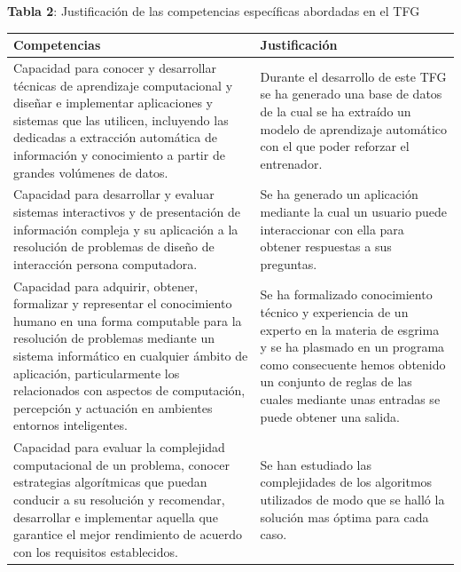 \documentclass[11pt,a4paper,twoside,final]{article}
\begin{document}
\begin{center}
   \textbf{Tabla 2}: Justificación de las competencias específicas abordadas en el TFG\\[1em]
   \begin{tabular}{p{} p{}}
		\textbf{Competencias} & \textbf{Justificación} \\
		\hline
			Capacidad para conocer y desarrollar técnicas de aprendizaje computacional y diseñar e implementar aplicaciones y sistemas que las utilicen, incluyendo las dedicadas a extracción automática de información y conocimiento a partir de grandes volúmenes de datos. & Durante el desarrollo de este TFG se ha generado una base de datos de la cual se ha extraído un modelo de aprendizaje automático con el que poder reforzar el entrenador.\\
			
            Capacidad para desarrollar y evaluar sistemas interactivos y de presentación de información compleja y su aplicación a la resolución de problemas de diseño de interacción persona computadora. & Se ha generado un aplicación mediante la cual un usuario puede interaccionar con ella para obtener respuestas a sus preguntas.\\
            
            Capacidad para adquirir, obtener, formalizar y representar el conocimiento humano en una forma computable para la resolución de problemas mediante un sistema informático en cualquier ámbito de aplicación, particularmente los relacionados con aspectos de computación, percepción y actuación en ambientes entornos inteligentes. &  Se ha formalizado conocimiento técnico y experiencia de un experto en la materia de esgrima y se ha plasmado en un programa como consecuente hemos obtenido un conjunto de reglas de las cuales mediante unas entradas se puede obtener una salida.  \\
            
			Capacidad para evaluar la complejidad computacional de un problema, conocer estrategias algorítmicas que puedan conducir a su resolución y recomendar, desarrollar e implementar aquella que garantice el mejor rendimiento de acuerdo con los requisitos establecidos. & Se han estudiado las complejidades de los algoritmos utilizados de modo que se halló la solución mas óptima para cada caso. \\
			
		\hline
   \end{tabular}
\end{center}
\end{document}
